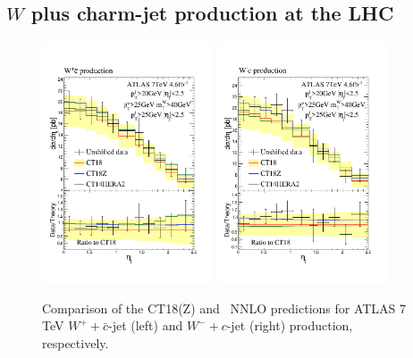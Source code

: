 \subsection{$W$ plus charm-jet production at the LHC}
\label{sec:Wcharm}

\begin{figure}[tb]
	\begin{center}
		\includegraphics[width=0.45\textwidth]{./fig/sec6/hepdata_mcfm_grid-WpCbar-ATLAS7_etal_CT18NNLO_mcfm_grid-WpCbar-ATLAS7_etal_CT18ZNNLO_mcfm_grid-WmCjet-ATLAS7_etal_CT14HERA2NNLO.pdf}
		\includegraphics[width=0.45\textwidth]{./fig/sec6/hepdata_mcfm_grid-WmCjet-ATLAS7_etal_CT18NNLO_mcfm_grid-WmCjet-ATLAS7_etal_CT18ZNNLO_mcfm_grid-WmCjet-ATLAS7_etal_CT14HERA2NNLO.pdf}
	\end{center}
	\vspace{-2ex}
	\caption{Comparison of the CT18(Z) and \CTHERAII~NNLO predictions for ATLAS 7 TeV $W^+ + \bar{c}$-jet (left) 
		and $W^-\! +\! c$-jet (right) production, respectively.
		\label{fig:atl7wpcbar}}
\end{figure}

